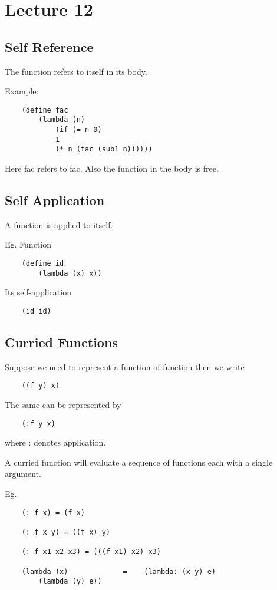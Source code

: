 \chapter{Lecture 12}

\section{Self Reference}

The function refers to itself in its body.

Example:
\begin{lstlisting}
    (define fac 
        (lambda (n)
            (if (= n 0) 
            1
            (* n (fac (sub1 n))))))
\end{lstlisting}
Here fac refers to fac. Also the function in the body is free.

\section{Self Application}
A function is applied to itself.

Eg. Function
\begin{lstlisting}
    (define id
        (lambda (x) x))
\end{lstlisting}

Its self-application
\begin{lstlisting}
    (id id)
\end{lstlisting}

\section{Curried Functions}
Suppose we need to represent a function of function then we write

\begin{lstlisting}
    ((f y) x)
\end{lstlisting}

The same can be represented by

\begin{lstlisting}
    (:f y x)
\end{lstlisting}

where : denotes application.

A curried function will evaluate a sequence of functions each with a single argument.

Eg.

\begin{lstlisting}
    (: f x) = (f x)
    
    (: f x y) = ((f x) y)

    (: f x1 x2 x3) = (((f x1) x2) x3)

    (lambda (x)             =    (lambda: (x y) e)
        (lambda (y) e))
\end{lstlisting}


